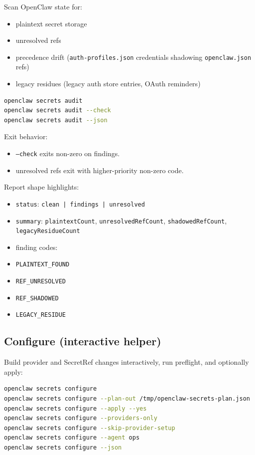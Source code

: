 Scan OpenClaw state for:

\begin{itemize}
  \item plaintext secret storage
  \item unresolved refs
  \item precedence drift (\texttt{auth-profiles.json} credentials shadowing \texttt{openclaw.json} refs)
  \item legacy residues (legacy auth store entries, OAuth reminders)
\end{itemize}


\begin{lstlisting}[language=bash]
openclaw secrets audit
openclaw secrets audit --check
openclaw secrets audit --json
\end{lstlisting}


Exit behavior:

\begin{itemize}
  \item \texttt{--check} exits non-zero on findings.
  \item unresolved refs exit with higher-priority non-zero code.
\end{itemize}


Report shape highlights:

\begin{itemize}
  \item \texttt{status}: \texttt{clean | findings | unresolved}
  \item \texttt{summary}: \texttt{plaintextCount}, \texttt{unresolvedRefCount}, \texttt{shadowedRefCount}, \texttt{legacyResidueCount}
  \item finding codes:
  \item \texttt{PLAINTEXT\_FOUND}
  \item \texttt{REF\_UNRESOLVED}
  \item \texttt{REF\_SHADOWED}
  \item \texttt{LEGACY\_RESIDUE}
\end{itemize}


\subsection{Configure (interactive helper)}


Build provider and SecretRef changes interactively, run preflight, and optionally apply:

\begin{lstlisting}[language=bash]
openclaw secrets configure
openclaw secrets configure --plan-out /tmp/openclaw-secrets-plan.json
openclaw secrets configure --apply --yes
openclaw secrets configure --providers-only
openclaw secrets configure --skip-provider-setup
openclaw secrets configure --agent ops
openclaw secrets configure --json
\end{lstlisting}


